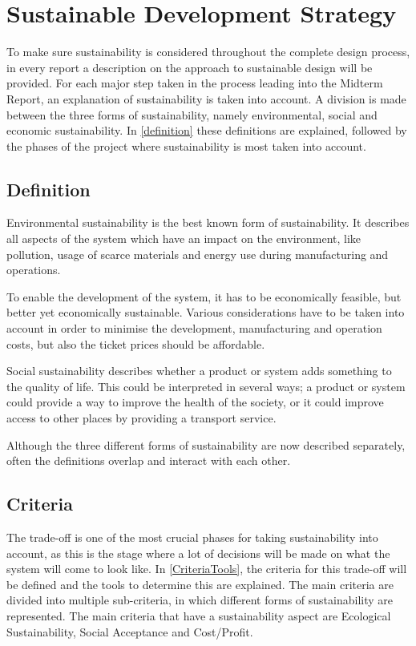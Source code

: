 \newpage
\chapter{Sustainable Development Strategy}
\label{ch-SDS}
To make sure sustainability is considered throughout the complete design process, in every report a description on the approach to sustainable design will be provided. For each major step taken in the process leading into the Midterm Report, an explanation of sustainability is taken into account. A division is made between the three forms of sustainability, namely environmental, social and economic sustainability. In \autoref{definition} these definitions are explained, followed by the phases of the project where sustainability is most taken into account. 




\section{Definition}
\label{definition}
Environmental sustainability is the best known form of sustainability. It describes all aspects of the system which have an impact on the environment, like pollution, usage of scarce materials and energy use during manufacturing and operations.

To enable the development of the system, it has to be economically feasible, but better yet economically sustainable. Various considerations have to be taken into account in order to minimise the development, manufacturing and operation costs, but also the ticket prices should be affordable.

Social sustainability describes whether a product or system adds something to the quality of life. This could be interpreted in several ways; a product or system could provide a way to improve the health of the society, or it could improve access to other places by providing a transport service.

Although the three different forms of sustainability are now described separately, often the definitions overlap and interact with each other. 


\section{Criteria}
\label{sustcrit}
The trade-off is one of the most crucial phases for taking sustainability into account, as this is the stage where a lot of decisions will be made on what the system will come to look like. In \autoref{CriteriaTools}, the criteria for this trade-off will be defined and the tools to determine this are explained. The main criteria are divided into multiple sub-criteria, in which different forms of sustainability are represented. The main criteria that have a sustainability aspect are Ecological Sustainability, Social Acceptance and Cost/Profit. 

